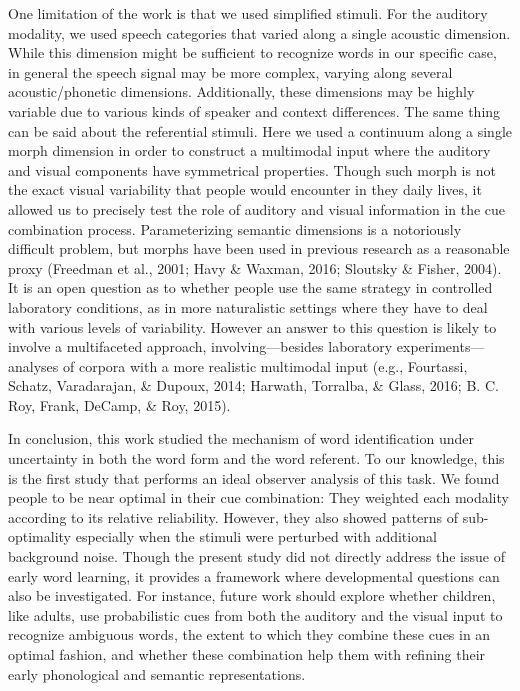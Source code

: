 \documentclass[english,floatsintext,man]{apa6}
\theoremstyle{definition}
\theoremstyle{definition}
\theoremstyle{definition}
\theoremstyle{remark}
\begin{document}
One limitation of the work is that we used simplified stimuli. For the
auditory modality, we used speech categories that varied along a single
acoustic dimension. While this dimension might be sufficient to
recognize words in our specific case, in general the speech signal may
be more complex, varying along several acoustic/phonetic dimensions.
Additionally, these dimensions may be highly variable due to various
kinds of speaker and context differences. The same thing can be said
about the referential stimuli. Here we used a continuum along a single
morph dimension in order to construct a multimodal input where the
auditory and visual components have symmetrical properties. Though such
morph is not the exact visual variability that people would encounter in
they daily lives, it allowed us to precisely test the role of auditory
and visual information in the cue combination process. Parameterizing
semantic dimensions is a notoriously difficult problem, but morphs have
been used in previous research as a reasonable proxy (Freedman et al.,
2001; Havy \& Waxman, 2016; Sloutsky \& Fisher, 2004). It is an open
question as to whether people use the same strategy in controlled
laboratory conditions, as in more naturalistic settings where they have
to deal with various levels of variability. However an answer to this
question is likely to involve a multifaceted approach,
involving---besides laboratory experiments---analyses of corpora with a
more realistic multimodal input (e.g., Fourtassi, Schatz, Varadarajan,
\& Dupoux, 2014; Harwath, Torralba, \& Glass, 2016; B. C. Roy, Frank,
DeCamp, \& Roy, 2015).

In conclusion, this work studied the mechanism of word identification
under uncertainty in both the word form and the word referent. To our
knowledge, this is the first study that performs an ideal observer
analysis of this task. We found people to be near optimal in their cue
combination: They weighted each modality according to its relative
reliability. However, they also showed patterns of sub-optimality
especially when the stimuli were perturbed with additional background
noise. Though the present study did not directly address the issue of
early word learning, it provides a framework where developmental
questions can also be investigated. For instance, future work should
explore whether children, like adults, use probabilistic cues from both
the auditory and the visual input to recognize ambiguous words, the
extent to which they combine these cues in an optimal fashion, and
whether these combination help them with refining their early
phonological and semantic representations.
\end{document}
